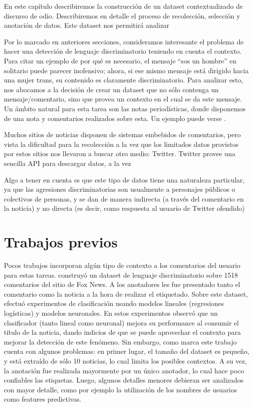 \label{chap:dataset_creation}

En este capítulo describiremos la construcción de un dataset contextualizado de discurso de odio. Describiremos en detalle el proceso de recolección, selección y anotación de datos. Este dataset nos permitirá analizar

Por lo marcado en anteriores secciones, consideramos interesante el problema de hacer una detección de lenguaje discriminatorio teniendo en cuenta el contexto. Para citar un ejemplo de por qué es necesario, el mensaje ``sos un hombre'' en solitario puede parecer inofensivo; ahora, si ese mismo mensaje está dirigido hacia una mujer trans, su contenido es claramente discriminatorio. Para analizar esto, nos abocamos a la decisión de crear un dataset que no sólo contenga un mensaje/comentario, sino que provea un contexto en el cual se da este mensaje. Un ámbito natural para esta tarea son las notas periodísticas, donde disponemos de una nota y comentarios realizados sobre esta. Un ejemplo puede verse .

Muchos sitios de noticias disponen de sistemas embebidos de comentarios, pero vista la dificultad para la recolección a la vez que los limitados datos provistos por estos sitios nos llevaron a buscar otro medio: Twitter. Twitter provee una sencilla API para descargar datos, a la vez

Algo a tener en cuenta es que este tipo de datos tiene una naturaleza particular, ya que las agresiones discriminatorias son usualmente a personajes públicos o colectivos de personas, y se dan de manera indirecta (a través del comentario en la noticia) y no directa (es decir, como respuesta al usuario de Twitter ofendido)

\section{Trabajos previos}
\label{sec:dataset_previous}

Pocos trabajos incorporan algún tipo de contexto a los comentarios del usuario para estas tareas. \citet{gao-huang-2017-detecting} construyó un dataset de lenguaje discriminatorio sobre 1518 comentarios del sitio de Fox News. A los anotadores les fue presentado tanto el comentario como la noticia a la hora de realizar el etiquetado. Sobre este dataset, efectuó experimentos de clasificación usando modelos lineales (regresiones logísticas) y modelos neuronales. En estos experimentos observó que un clasificador (tanto lineal como neuronal) mejora su performance al consumir el título de la noticia, dando indicios de que se puede aprovechar el contexto para mejorar la detección de este fenómeno. Sin embargo, como marca \citet{pavlopoulos2020toxicity} este trabajo cuenta con algunos problemas: en primer lugar, el tamaño del dataset es pequeño, y está extraído de sólo 10 noticias, lo cual limita los posibles contextos. A su vez, la anotación fue realizada mayormente por un único anotador, lo cual hace poco confiables las etiquetas. Luego, algunos detalles menores debieran ser analizados con mayor detalle, como por ejemplo la utilización de los nombres de usuarios como features predictivas.

